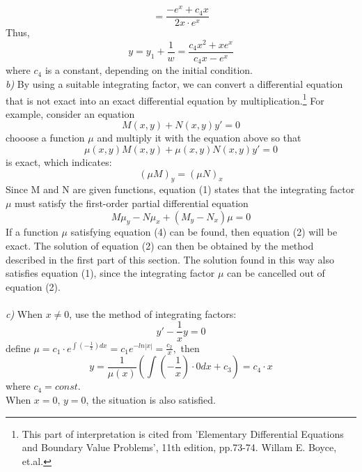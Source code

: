 \documentclass{article}
\begin{document}
$$=\frac{-e^x+c_4x}{2x\cdot e^x}$$
Thus,
$$y=y_1+\frac{1}{w}=\frac{c_4x^2+xe^x}{c_4x-e^x}$$
where $c_4$ is a constant, depending on the initial condition.
\vspace{2em}
\\
\textit{b)}\,\,By using a suitable integrating factor, we can convert a differential equation that is not exact into an exact differential equation by multiplication.\footnote{This part of interpretation is cited from 'Elementary Differential Equations and Boundary Value Problems', 11th edition, pp.73-74. Willam E. Boyce, et.al.} For example, consider an equation 
\begin{equation}
M(x,y)+N(x,y)y'=0 
\end{equation}
chooose a function $\mu$ and multiply it with the equation above so that
\begin{equation}
\mu(x,y)M(x,y)+\mu(x,y)N(x,y)y'=0
\end{equation}
is exact, which indicates:
\begin{equation}
(\mu M)_y=(\mu N)_x
\end{equation}
Since M and N are given functions, equation (1) states that the integrating factor $\mu$ must satisfy the first-order partial differential equation
\begin{equation}
M\mu_y-N\mu_x+(M_y-N_x)\mu =0
\end{equation}
If a function $\mu$ satisfying equation (4) can be found, then equation (2) will be exact. The solution of equation (2) can then be obtained by the method described in the first part of this section. The solution found in this way also satisfies equation (1), since the integrating factor $\mu$ can be cancelled out of equation (2).\\
\\
\textit{c)}\,\,When $x\neq 0$, use the method of integrating factors:
$$y'-\frac{1}{x}y=0$$
define $\mu=c_1\cdot e^{\int(-\frac{1}{x})dx}=c_1e^{-ln|x|}=\frac{c_2}{x},$
then 
$$y=\frac{1}{\mu(x)}(\int(-\frac{1}{x})\cdot 0dx+c_3)=c_4\cdot x$$
where $c_4=const.$\\

When $x=0$, $y=0$, the situation is also satisfied.
\end{document}
